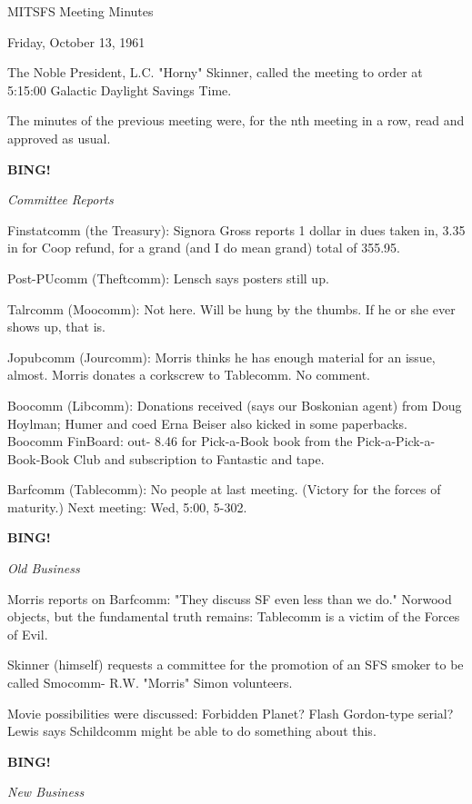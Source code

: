 \documentclass[12pt]{article}
\newcommand{\bing}{{\bf BING!} }
\newcommand{\goto}[1]{\bing \vskip 12pt \centerline{{\em{#1}}}}
\begin{document}
\begin{center}

MITSFS Meeting Minutes

Friday, October 13, 1961

\end{center}
 
\vspace{12pt}

\setlength{\parskip}{6pt}

\noindent
The Noble President, L.C. "Horny" Skinner, called the meeting to order at 5:15:00 Galactic Daylight Savings Time.

The minutes of the previous meeting were, for the nth meeting in a row, read and approved as usual.

\goto{Committee Reports}

Finstatcomm (the Treasury): Signora Gross reports 1 dollar in dues taken in, 3.35 in for Coop refund, for a grand (and I do mean grand) total of 355.95.

Post-PUcomm (Theftcomm): Lensch says posters still up.

Talrcomm (Moocomm): Not here. Will be hung by the thumbs. If he or she ever shows up, that is.

Jopubcomm (Jourcomm): Morris thinks he has enough material for an issue, almost. Morris donates a corkscrew to Tablecomm. No comment.

Boocomm (Libcomm): Donations received (says our Boskonian agent) from Doug Hoylman; Humer and coed Erna Beiser also kicked in some paperbacks. Boocomm FinBoard: out- 8.46 for Pick-a-Book book from the Pick-a-Pick-a-Book-Book Club and subscription to Fantastic and tape.

Barfcomm (Tablecomm): No people at last meeting. (Victory for the forces of maturity.) Next meeting: Wed, 5:00, 5-302.

\goto{Old Business}

Morris reports on Barfcomm: "They discuss SF even less than we do." Norwood objects, but the fundamental truth remains: Tablecomm is a victim of the Forces of Evil.

Skinner (himself) requests a committee for the promotion of an SFS smoker to be called Smocomm- R.W. "Morris" Simon volunteers.

Movie possibilities were discussed: Forbidden Planet? Flash Gordon-type serial? Lewis says Schildcomm might be able to do something about this.

\goto{New Business}
\end{document}
